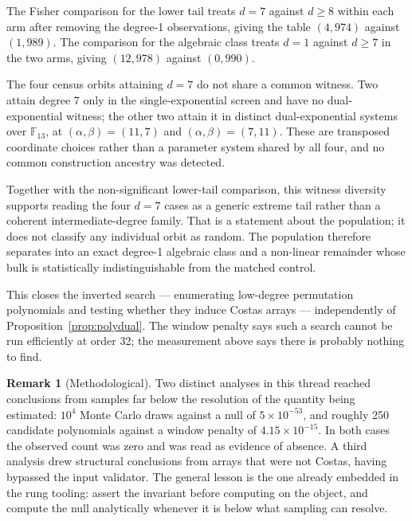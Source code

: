 \documentclass[11pt,a4paper]{article}
\theoremstyle{definition}
\newtheorem{remark}[theorem]{Remark}
\newcommand{\F}{\mathbb{F}}
\begin{document}
\noindent The Fisher comparison for the lower tail treats $d=7$ against
$d\ge8$ within each arm after removing the degree-1 observations, giving the
table $(4,974)$ against $(1,989)$. The comparison for the algebraic class treats
$d=1$ against $d\ge7$ in the two arms, giving $(12,978)$ against $(0,990)$.

The four census orbits attaining $d=7$ do not share a common witness. Two attain
degree 7 only in the single-exponential screen and have no dual-exponential
witness; the other two attain it in distinct dual-exponential systems over
$\F_{13}$, at $(\alpha,\beta)=(11,7)$ and $(\alpha,\beta)=(7,11)$. These are
transposed coordinate choices rather than a parameter system shared by all four,
and no common construction ancestry was detected.

Together with the non-significant lower-tail comparison, this witness diversity
supports reading the four $d=7$ cases as a generic extreme tail rather than a
coherent intermediate-degree family. That is a statement about the population; it
does not classify any individual orbit as random. The population therefore
separates into an exact degree-1 algebraic class and a non-linear remainder whose
bulk is statistically indistinguishable from the matched control.

This closes the inverted search --- enumerating low-degree permutation
polynomials and testing whether they induce Costas arrays --- independently of
Proposition~\ref{prop:polydual}. The window penalty says such a search cannot be
run efficiently at order 32; the measurement above says there is probably nothing
to find.

\begin{remark}[Methodological]
Two distinct analyses in this thread reached conclusions from samples far below
the resolution of the quantity being estimated: $10^4$ Monte Carlo draws against a
null of $5\times10^{-53}$, and roughly 250 candidate polynomials against a window
penalty of $4.15\times10^{-15}$. In both cases the observed count was zero and was
read as evidence of absence. A third analysis drew structural conclusions from
arrays that were not Costas, having bypassed the input validator. The general
lesson is the one already embedded in the rung tooling: assert the invariant
before computing on the object, and compute the null analytically whenever it is
below what sampling can resolve.
\end{remark}

\end{document}
